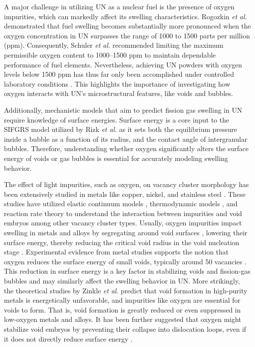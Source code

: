 \documentclass[preprint,12pt,sort&compress]{elsarticle}
\newcommand{\?}{\stackrel{?}{=}}
\begin{document}
A major challenge in utilizing UN as a nuclear fuel is the presence of oxygen impurities, which can markedly affect its swelling characteristics. Rogozkin \textit{et al.} \cite{Rogozkin2003} demonstrated that fuel swelling becomes substantially more pronounced when the oxygen concentration in UN surpasses the range of 1000 to 1500 parts per million (ppm). Consequently, Schuler \textit{et al.} \cite{Schuler2017} recommended limiting the maximum permissible oxygen content to 1000--1500 ppm to maintain dependable performance of fuel elements. Nevertheless, achieving UN powders with oxygen levels below 1500 ppm has thus far only been accomplished under controlled laboratory conditions \cite{Schuler2017}. This highlights the importance of investigating how oxygen interacts with UN's microstructural features, like voids and bubbles. 

Additionally, mechanistic models that aim to predict fission gas swelling in UN require knowledge of surface energies. Surface energy is a core input to the SIFGRS model utilized by Rizk \textit{et al.} \cite{Rizk2025} as it sets both the equilibrium pressure inside a bubble as a function of its radius, and the contact angle of intergranular bubbles. Therefore, understanding whether oxygen significantly alters the surface energy of voids or gas bubbles is essential for accurately modeling swelling behavior.

The effect of light impurities, such as oxygen, on vacancy cluster morphology has been extensively studied in metals like copper, nickel, and stainless steel \cite{Zinkle1987a, Zinkle1987b, Zinkle1990, Igata1998}. These studies have utilized elastic continuum models \cite{Zinkle1987a, Zinkle1987b}, thermodynamic models \cite{Zinkle1990}, and reaction rate theory \cite{Igata1998} to understand the interaction between impurities and void embryos among other vacancy cluster types. Usually, oxygen impurities impact swelling in metals and alloys by segregating around void surfaces \cite{McLean1957}, lowering their surface energy, thereby reducing the critical void radius in the void nucleation stage \cite{Zinkle1987a, Igata1998}. Experimental evidence from metal studies supports the notion that oxygen reduces the surface energy of small voids, typically around 50 vacancies \cite{Zinkle1990}. This reduction in surface energy is a key factor in stabilizing voids and fission-gas bubbles and may similarly affect the swelling behavior in UN. More strikingly, the theoretical studies by Zinkle \textit{et al.} \cite{Zinkle1987a, Zinkle1987b} predict that void formation in high-purity metals is energetically unfavorable, and impurities like oxygen are essential for voids to form. That is, void formation is greatly reduced or even suppressed in low-oxygen metals and alloys. It has been further suggested that oxygen might stabilize void embryos by preventing their collapse into dislocation loops, even if it does not directly reduce surface energy \cite{Zinkle1987b, Zinkle1990}.
\end{document}
